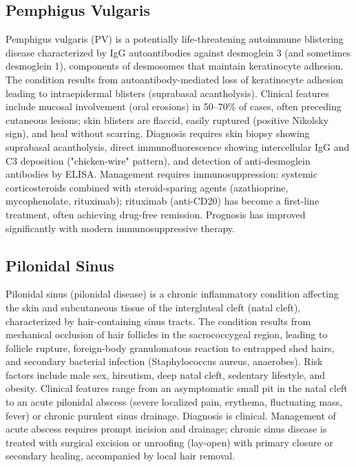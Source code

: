 \subsection{Pemphigus Vulgaris}
\label{sec:Pemphigus Vulgaris}
Pemphigus vulgaris (PV) is a potentially life-threatening autoimmune blistering disease characterized by IgG autoantibodies against desmoglein 3 (and sometimes desmoglein 1), components of desmosomes that maintain keratinocyte adhesion. The condition results from autoantibody-mediated loss of keratinocyte adhesion leading to intraepidermal blisters (suprabasal acantholysis). Clinical features include mucosal involvement (oral erosions) in 50--70\% of cases, often preceding cutaneous lesions; skin blisters are flaccid, easily ruptured (positive Nikolsky sign), and heal without scarring. Diagnosis requires skin biopsy showing suprabasal acantholysis, direct immunofluorescence showing intercellular IgG and C3 deposition ("chicken-wire" pattern), and detection of anti-desmoglein antibodies by ELISA. Management requires immunosuppression: systemic corticosteroids combined with steroid-sparing agents (azathioprine, mycophenolate, rituximab); rituximab (anti-CD20) has become a first-line treatment, often achieving drug-free remission. Prognosis has improved significantly with modern immunosuppressive therapy.

\subsection{Pilonidal Sinus}
\label{sec:Pilonidal Sinus}
Pilonidal sinus (pilonidal disease) is a chronic inflammatory condition affecting the skin and subcutaneous tissue of the intergluteal cleft (natal cleft), characterized by hair-containing sinus tracts. The condition results from mechanical occlusion of hair follicles in the sacrococcygeal region, leading to follicle rupture, foreign-body granulomatous reaction to entrapped shed hairs, and secondary bacterial infection (Staphylococcus aureus, anaerobes). Risk factors include male sex, hirsutism, deep natal cleft, sedentary lifestyle, and obesity. Clinical features range from an asymptomatic small pit in the natal cleft to an acute pilonidal abscess (severe localized pain, erythema, fluctuating mass, fever) or chronic purulent sinus drainage. Diagnosis is clinical. Management of acute abscess requires prompt incision and drainage; chronic sinus disease is treated with surgical excision or unroofing (lay-open) with primary closure or secondary healing, accompanied by local hair removal.

